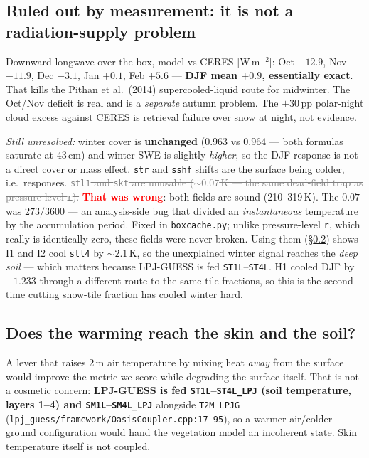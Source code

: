 \documentclass[10pt]{article}
\newcommand{\dead}[1]{\textcolor{gray}{\sout{#1}}}
\begin{document}
\subsection{Ruled out by measurement: it is not a radiation-supply problem}\label{sub:r15lw}
Downward longwave over the box, model vs CERES [W\,m$^{-2}$]: Oct $\mathbf{-12.9}$,
Nov $\mathbf{-11.9}$, Dec $-3.1$, Jan $+0.1$, Feb $+5.6$ --- \textbf{DJF mean $+0.9$,
essentially exact}. That kills the Pithan et al.\ (2014) supercooled-liquid route for
midwinter. The Oct/Nov deficit is real and is a \emph{separate} autumn problem. The
$+30$\,pp polar-night cloud excess against CERES is retrieval failure over snow at night,
not evidence.

\emph{Still unresolved:} winter cover is \textbf{unchanged} ($0.963$ vs $0.964$ --- both
formulas saturate at 43\,cm) and winter SWE is slightly \emph{higher}, so the DJF response is
not a direct cover or mass effect. \texttt{str} and \texttt{sshf} shifts are the surface being
colder, i.e.\ responses. \dead{\texttt{stl1} and \texttt{skt} are unusable ($\sim0.07$\,K
--- the same dead-field trap as pressure-level \texttt{r}).} \textcolor{red}{\textbf{That was
wrong}}: both fields are sound (210--319\,K). The $0.07$ was $273/3600$ --- an analysis-side
bug that divided an \emph{instantaneous} temperature by the accumulation period. Fixed in
\texttt{boxcache.py}; unlike pressure-level \texttt{r}, which really is identically zero,
these fields were never broken. Using them (\S\ref{sub:skinsoil}) shows I1 and I2 cool
\texttt{stl4} by ${\sim}2.1$\,K, so the unexplained winter signal reaches the \emph{deep
soil} --- which matters because LPJ-GUESS is fed \texttt{ST1L}--\texttt{ST4L}. H1 cooled DJF by
$-1.233$ through a different route to the same tile fractions, so this is the second time
cutting snow-tile fraction has cooled winter hard.

\subsection{Does the warming reach the skin and the soil?}\label{sub:skinsoil}
A lever that raises 2\,m air temperature by mixing heat \emph{away} from the surface would
improve the metric we score while degrading the surface itself. That is not a cosmetic
concern: \textbf{LPJ-GUESS is fed \texttt{ST1L}--\texttt{ST4L\_LPJ} (soil temperature, layers
1--4) and \texttt{SM1L}--\texttt{SM4L\_LPJ}} alongside \texttt{T2M\_LPJG}
(\texttt{lpj\_guess/framework/OasisCoupler.cpp:17-95}), so a warmer-air/colder-ground
configuration would hand the vegetation model an incoherent state. Skin temperature itself is
not coupled.
\end{document}
